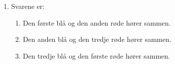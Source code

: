 \begin{enumerate}
		
	\item \label{it:diff12ans} Svarene er:
	\begin{enumerate}
		\item Den første blå og den anden røde hører sammen.
		\item Den anden blå og den tredje røde hører sammen.
		\item Den tredje blå og den første røde hører sammen.
	\end{enumerate}
%		
%		

\end{enumerate}
